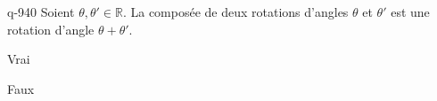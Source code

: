 \begin{truefalse}{q-940}
Soient $\theta, \theta'\in\mathbb R$. La composée de deux rotations d'angles $\theta$ et $\theta'$ est une rotation d'angle $\theta+\theta'$.
\item Vrai
\item* Faux
\end{truefalse}

